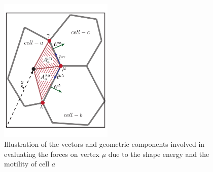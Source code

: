 \documentclass[
reprint
,aps
,amssymb
,amsmath
,superscriptaddress
]{revtex4-1}
\begin{document}
\begin{figure}[!t]  
\begin{center}
    \includegraphics[width=0.48\textwidth]{manuscript_images_avm_shape_forces.pdf}
    \caption{\label{fig:app_shape_forces}Illustration of the vectors and geometric components involved in evaluating the forces on vertex $\mu$ due to the shape energy and the motility of cell $a$}
    \end{center}
\end{figure}
\end{document}
